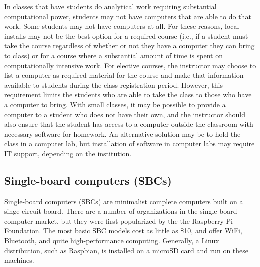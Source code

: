 In classes that have students do analytical work requiring substantial computational power, students may not have computers that are able to do that work. Some students may not have computers at all. For these reasons, local installs may not be the best option for a required course (i.e., if a student must take the course regardless of whether or not they have a computer they can bring to class) or for a course where a substantial amount of time is spent on computationally intensive work. For elective courses, the instructor may choose to list a computer as required material for the course and make that information available to students during the class registration period. However, this requirement limits the students who are able to take the class to those who have a computer to bring. With small classes, it may be possible to provide a computer to a student who does not have their own, and the instructor should also ensure that the student has access to a computer outside the classroom with necessary software for homework. An alternative solution may be to hold the class in a computer lab, but installation of software in computer labs may require IT support, depending on the institution.

\subsection{Single-board computers (SBCs)}\label{sbc}


Single-board computers (SBCs) are minimalist complete computers built on a
singe circuit board.
There are a number of organizations in the single-board computer market, but
they were first popularized by the the Raspberry Pi Foundation.
The most basic SBC models cost as little as \$10, and offer WiFi, Bluetooth,
and quite high-performance computing.
Generally, a Linux distribution, such as Raspbian, is installed
on a microSD card and run on these machines.

